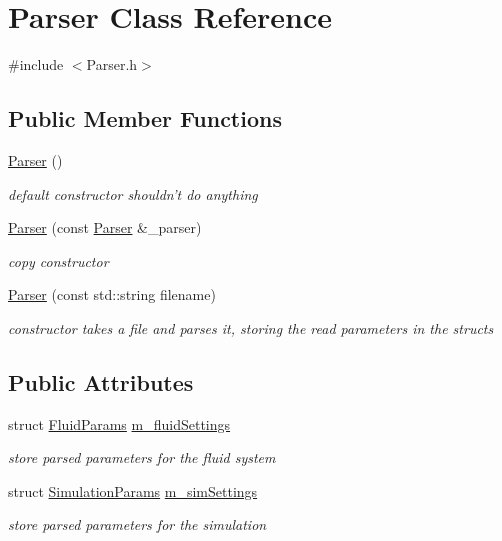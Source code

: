 \hypertarget{classParser}{
\section{Parser Class Reference}
\label{classParser}
}


{\ttfamily \#include $<$Parser.h$>$}\subsection*{Public Member Functions}
\begin{DoxyCompactItemize}
\item 
\hyperlink{classParser_a12234f6cd36b61af4b50c94a179422c1}{Parser} ()
\begin{DoxyCompactList}\small\item\em default constructor shouldn't do anything \item\end{DoxyCompactList}\item 
\hyperlink{classParser_a2cc8ece9a9d047e1511ac7492d9bc4d2}{Parser} (const \hyperlink{classParser}{Parser} \&\_\-parser)
\begin{DoxyCompactList}\small\item\em copy constructor \item\end{DoxyCompactList}\item 
\hyperlink{classParser_aa5750b02ac1bd78623e6bb0b9d2c0f4e}{Parser} (const std::string filename)
\begin{DoxyCompactList}\small\item\em constructor takes a file and parses it, storing the read parameters in the structs \item\end{DoxyCompactList}\end{DoxyCompactItemize}
\subsection*{Public Attributes}
\begin{DoxyCompactItemize}
\item 
struct \hyperlink{structFluidParams}{FluidParams} \hyperlink{classParser_afa0c063fcebcccbbf37a15b034954d1b}{m\_\-fluidSettings}
\begin{DoxyCompactList}\small\item\em store parsed parameters for the fluid system \item\end{DoxyCompactList}\item 
struct \hyperlink{structSimulationParams}{SimulationParams} \hyperlink{classParser_acf49fee1776c3a865fd38487e7680f6f}{m\_\-simSettings}
\begin{DoxyCompactList}\small\item\em store parsed parameters for the simulation \item\end{DoxyCompactList}\end{DoxyCompactItemize}


